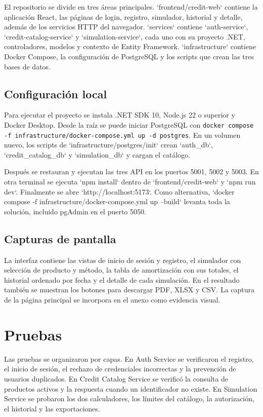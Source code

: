 \documentclass[12pt,a4paper]{article}
\begin{document}
El repositorio se divide en tres áreas principales. `frontend/credit-web`
contiene la aplicación React, las páginas de login, registro, simulador,
historial y detalle, además de los servicios HTTP del navegador. `services`
contiene `auth-service`, `credit-catalog-service` y `simulation-service`, cada
uno con su proyecto .NET, controladores, modelos y contexto de Entity
Framework. `infrastructure` contiene Docker Compose, la configuración de
PostgreSQL y los scripts que crean las tres bases de datos.

\subsection{Configuración local}

Para ejecutar el proyecto se instala .NET SDK 10, Node.js 22 o superior y
Docker Desktop. Desde la raíz se puede iniciar PostgreSQL con
\texttt{docker compose -f infrastructure/docker-compose.yml up -d postgres}.
En un volumen nuevo, los scripts de `infrastructure/postgres/init` crean
`auth\_db`, `credit\_catalog\_db` y `simulation\_db` y cargan el catálogo.

Después se restauran y ejecutan las tres API en los puertos 5001, 5002 y 5003.
En otra terminal se ejecuta `npm install` dentro de `frontend/credit-web` y
`npm run dev`. Finalmente se abre `http://localhost:5173`. Como alternativa,
`docker compose -f infrastructure/docker-compose.yml up --build` levanta toda
la solución, incluido pgAdmin en el puerto 5050.

\subsection{Capturas de pantalla}

La interfaz contiene las vistas de inicio de sesión y registro, el simulador
con selección de producto y método, la tabla de amortización con sus totales,
el historial ordenado por fecha y el detalle de cada simulación. En el
resultado también se muestran los botones para descargar PDF, XLSX y CSV. La
captura de la página principal se incorpora en el anexo como evidencia visual.

\section{Pruebas}

Las pruebas se organizaron por capas. En Auth Service se verificaron el
registro, el inicio de sesión, el rechazo de credenciales incorrectas y la
prevención de usuarios duplicados. En Credit Catalog Service se verificó la
consulta de productos activos y la respuesta cuando un identificador no
existe. En Simulation Service se probaron los dos calculadores, los límites
del catálogo, la autorización, el historial y las exportaciones.
\end{document}
